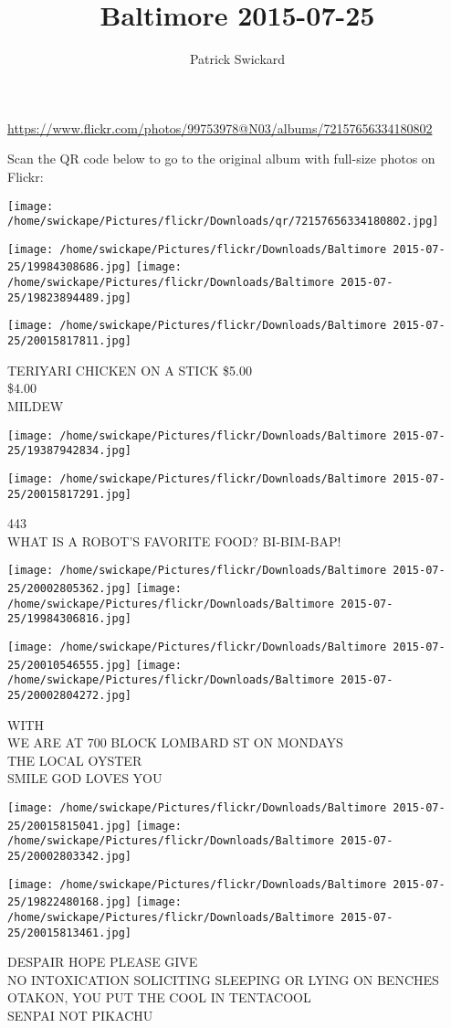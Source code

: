 \documentclass[10pt,letterpaper]{article}
\title{Baltimore 2015-07-25}
\author{Patrick Swickard}
\date{}
\begin{document}
\maketitle

\url{https://www.flickr.com/photos/99753978@N03/albums/72157656334180802}

Scan the QR code below to go to the original album with full-size photos on Flickr:

\texttt{[image: /home/swickape/Pictures/flickr/Downloads/qr/72157656334180802.jpg]}
\pagebreak

\texttt{[image: /home/swickape/Pictures/flickr/Downloads/Baltimore 2015-07-25/19984308686.jpg]}
\texttt{[image: /home/swickape/Pictures/flickr/Downloads/Baltimore 2015-07-25/19823894489.jpg]}

\texttt{[image: /home/swickape/Pictures/flickr/Downloads/Baltimore 2015-07-25/20015817811.jpg]}

TERIYARI CHICKEN ON A STICK \$5.00\\
\$4.00\\
MILDEW
\pagebreak

\texttt{[image: /home/swickape/Pictures/flickr/Downloads/Baltimore 2015-07-25/19387942834.jpg]}

\vspace{0.25in}
\texttt{[image: /home/swickape/Pictures/flickr/Downloads/Baltimore 2015-07-25/20015817291.jpg]}

443\\
WHAT IS A ROBOT'S FAVORITE FOOD?  BI{-}BIM{-}BAP!
\pagebreak

\texttt{[image: /home/swickape/Pictures/flickr/Downloads/Baltimore 2015-07-25/20002805362.jpg]}
\texttt{[image: /home/swickape/Pictures/flickr/Downloads/Baltimore 2015-07-25/19984306816.jpg]}

\texttt{[image: /home/swickape/Pictures/flickr/Downloads/Baltimore 2015-07-25/20010546555.jpg]}
\texttt{[image: /home/swickape/Pictures/flickr/Downloads/Baltimore 2015-07-25/20002804272.jpg]}

WITH\\
WE ARE AT 700 BLOCK LOMBARD ST ON MONDAYS\\
THE LOCAL OYSTER\\
SMILE GOD LOVES YOU
\pagebreak

\texttt{[image: /home/swickape/Pictures/flickr/Downloads/Baltimore 2015-07-25/20015815041.jpg]}
\texttt{[image: /home/swickape/Pictures/flickr/Downloads/Baltimore 2015-07-25/20002803342.jpg]}

\texttt{[image: /home/swickape/Pictures/flickr/Downloads/Baltimore 2015-07-25/19822480168.jpg]}
\texttt{[image: /home/swickape/Pictures/flickr/Downloads/Baltimore 2015-07-25/20015813461.jpg]}

DESPAIR HOPE PLEASE GIVE\\
NO INTOXICATION SOLICITING SLEEPING OR LYING ON BENCHES\\
OTAKON, YOU PUT THE COOL IN TENTACOOL\\
SENPAI NOT PIKACHU
\pagebreak
\end{document}

